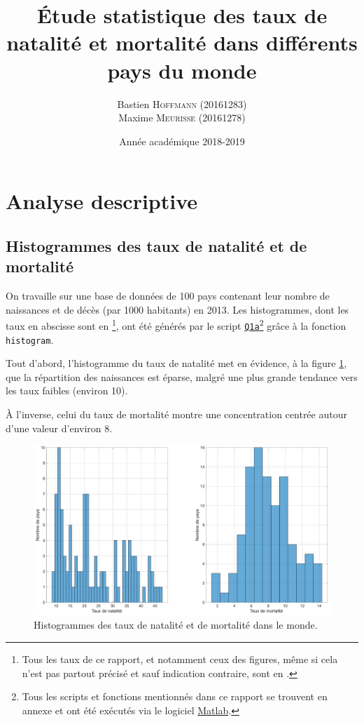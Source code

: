 \documentclass[a4paper, 12pt]{article}
\title{Étude statistique des taux de natalité et mortalité dans différents pays du monde}
\author{Bastien \textsc{Hoffmann} (20161283)\\Maxime \textsc{Meurisse} (20161278)\\}
\date{Année académique 2018-2019}
\begin{document}
	
	
	
	\section{Analyse descriptive}
	
	\subsection{Histogrammes des taux de natalité et de mortalité}
	\label{subsec:Q1a}
	On travaille sur une base de données de \num{100} pays contenant leur nombre de naissances et de décès (par \num{1000} habitants) en 2013. Les histogrammes, dont les taux en abscisse sont en \textperthousand\footnote{Tous les taux de ce rapport, et notamment ceux des figures, même si cela n'est pas partout précisé et sauf indication contraire, sont en \textperthousand.}, ont été générés par le script \hyperref[subsec:code-Q1]{\texttt{Q1a}}\footnote{Tous les scripts et fonctions mentionnés dans ce rapport se trouvent en annexe et ont été exécutés via le logiciel \href{https://mathworks.com/products/matlab.html}{Matlab}.} grâce à la fonction \texttt{histogram}.\par
	
	Tout d'abord, l'histogramme du taux de natalité met en évidence, à la figure \ref{fig:Q1a}, que la répartition des naissances est éparse, malgré une plus grande tendance vers les taux faibles (environ \num{10}\textperthousand).\par
	
	À l'inverse, celui du taux de mortalité montre une concentration centrée autour d'une valeur d'environ \num{8}\textperthousand.\par
	
	\begin{figure}[!ht]
	    \centering
	    \includegraphics[width=\textwidth]{resources/pdf/figures/Q1a.pdf}
	    \caption{Histogrammes des taux de natalité et de mortalité dans le monde.}
	    \label{fig:Q1a}
	\end{figure}
	
\end{document}
